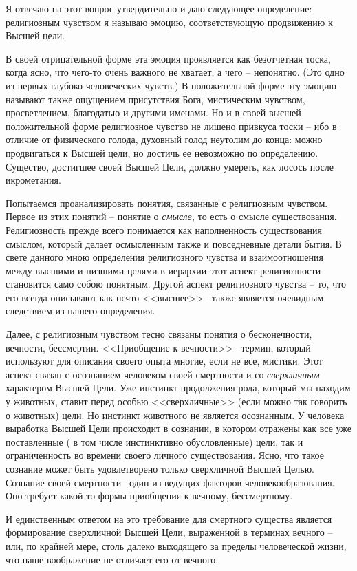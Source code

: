 \documentclass{book}
\begin{document}
Я отвечаю на этот вопрос утвердительно и даю следующее определение: религиозным чувством я называю эмоцию, соот­ветствующую продвижению к Высшей цели.

В своей отрицательной форме эта эмоция проявляется как безотчетная тоска, когда ясно, что чего-то очень важного не хва­тает, а чего -- непонятно. (Это одно из первых глубоко челове­ческих чувств.) В положительной форме эту эмоцию называют также ощущением присутствия Бога, мистическим чувством, просветлением, благодатью и другими именами. Но и в своей высшей положительной форме религиозное чувство не лишено привкуса тоски -- ибо в отличие от физического голода, духов­ный голод неутолим до конца: можно продвигаться к Высшей цели, но достичь ее невозможно по определению. Существо, достигшее своей Высшей Цели, должно умереть, как лосось пос­ле икрометания.

Попытаемся проанализировать понятия, связанные с рели­гиозным чувством. Первое из этих понятий -- понятие о \textit{смысле,} то есть о смысле существования. Религиозность прежде всего понимается как наполненность существования смыслом, кото­рый делает осмысленным также и повседневные детали бытия. В свете данного мною определения религиозного чувства и взаимоотношения между высшими и низшими целями в иерар­хии этот аспект религиозности становится само собою понят­ным. Другой аспект религиозного чувства -- то, что его всегда описывают как нечто <<высшее>> --также является очевидным следствием из нашего определения.

Далее, с религиозным чувством тесно связаны понятия о бесконечности, вечности, бессмертии. <<Приобщение к вечности>> --термин, который используют для описания своего опы­та многие, если не все, мистики. Этот аспект связан с осозна­нием человеком своей смертности и со \textit{сверхличным}  характе­ром Высшей Цели. Уже инстинкт продолжения рода, который мы находим у животных, ставит перед особью <<сверхличные>> (если можно так говорить о животных) цели. Но инстинкт жи­вотного не является осознанным. У человека выработка Выс­шей Цели происходит в сознании, в котором отражены как все уже поставленные ( в том числе инстинктивно обусловленные) цели, так и ограниченность во времени своего личного сущест­вования. Ясно, что такое сознание может быть удовлетворено только сверхличной Высшей Целью. Сознание своей смертно­сти-- один из ведущих факторов человекообразования. Оно тре­бует какой-то формы приобщения к вечному, бессмертному.

И единственным ответом на это требование для смертного су­щества является формирование сверхличной Высшей Цели, выраженной в терминах вечного -- или, по крайней мере, столь далеко выходящего за пределы человеческой жизни, что наше воображение не отличает его от вечного.
\end{document}
